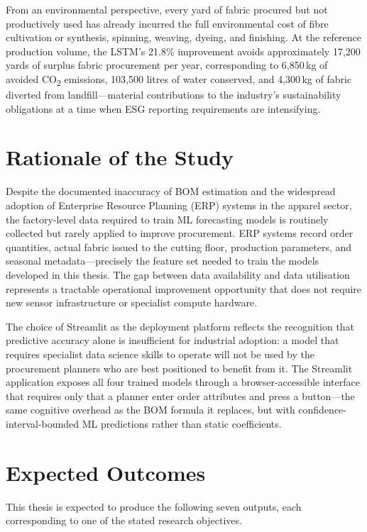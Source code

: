 From an environmental perspective, every yard of fabric procured but not productively used has already incurred the full environmental cost of fibre cultivation or synthesis, spinning, weaving, dyeing, and finishing. At the reference production volume, the LSTM's 21.8\% improvement avoids approximately 17{,}200 yards of surplus fabric procurement per year, corresponding to 6{,}850\,kg of avoided CO\textsubscript{2} emissions, 103{,}500 litres of water conserved, and 4{,}300\,kg of fabric diverted from landfill---material contributions to the industry's sustainability obligations at a time when ESG reporting requirements are intensifying.

\secdiv
\section{Rationale of the Study}
Despite the documented inaccuracy of BOM estimation and the widespread adoption of Enterprise Resource Planning (ERP) systems in the apparel sector, the factory-level data required to train ML forecasting models is routinely collected but rarely applied to improve procurement. ERP systems record order quantities, actual fabric issued to the cutting floor, production parameters, and seasonal metadata---precisely the feature set needed to train the models developed in this thesis. The gap between data availability and data utilisation represents a tractable operational improvement opportunity that does not require new sensor infrastructure or specialist compute hardware.

The choice of Streamlit as the deployment platform reflects the recognition that predictive accuracy alone is insufficient for industrial adoption: a model that requires specialist data science skills to operate will not be used by the procurement planners who are best positioned to benefit from it. The Streamlit application exposes all four trained models through a browser-accessible interface that requires only that a planner enter order attributes and press a button---the same cognitive overhead as the BOM formula it replaces, but with confidence-interval-bounded ML predictions rather than static coefficients.

\secdiv
\section{Expected Outcomes}
This thesis is expected to produce the following seven outputs, each corresponding to one of the stated research objectives.

